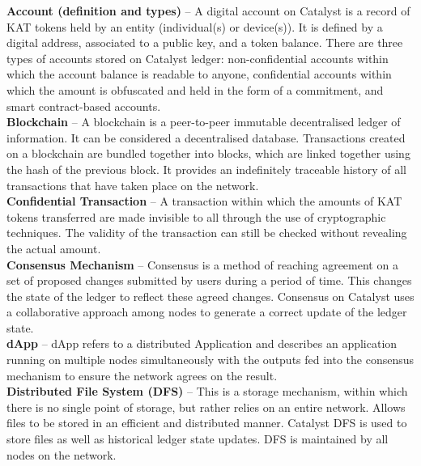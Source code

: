 \textbf{Account (definition and types)} – A digital account on Catalyst is a record of KAT tokens held by an entity (individual(s) or device(s)). It is defined by a digital address, associated to a public key, and a token balance. There are three types of accounts stored on Catalyst ledger: non-confidential accounts within which the account balance is readable to anyone, confidential accounts within which the amount is obfuscated and held in the form of a commitment, and smart contract-based accounts. \\
		

\textbf{Blockchain} – A blockchain is a peer-to-peer immutable decentralised ledger of information. It can be considered a decentralised database. Transactions created on a blockchain are bundled together into blocks, which are linked together using the hash of the previous block. It provides an indefinitely traceable history of all transactions that have taken place on the network.\\

\textbf{Confidential Transaction} – A transaction within which the amounts of KAT tokens transferred are made invisible to all through the use of cryptographic techniques. The validity of the transaction can still be checked without revealing the actual amount. \\

\textbf{Consensus Mechanism} – Consensus is a method of reaching agreement on a set of proposed changes submitted by users during a period of time. This changes the state of the ledger to reflect these agreed changes. Consensus on Catalyst uses a collaborative approach among nodes to generate a correct update of the ledger state.\\

\textbf{dApp} – dApp refers to a distributed Application and describes an application running on multiple nodes simultaneously with the outputs fed into the consensus mechanism to ensure the network agrees on the result.\\

\textbf{Distributed File System (DFS)} – This is a storage mechanism, within which there is no single point of storage, but rather relies on an entire network. Allows files to be stored in an efficient and distributed manner. Catalyst DFS is used to store files as well as historical ledger state updates. DFS is maintained by all nodes on the network. \\

